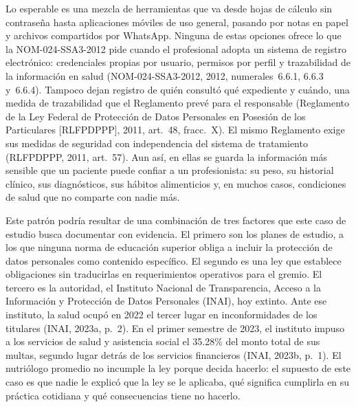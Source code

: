 \documentclass[12pt, a4paper]{article}
\begin{document}
Lo esperable es una mezcla de herramientas que va desde hojas de cálculo
sin contraseña hasta aplicaciones móviles de uso general, pasando por
notas en papel y archivos compartidos por WhatsApp. Ninguna de estas
opciones ofrece lo que la NOM-024-SSA3-2012 pide cuando el profesional
adopta un sistema de registro electrónico: credenciales propias por
usuario, permisos por perfil y trazabilidad de la información en salud
(NOM-024-SSA3-2012, 2012, numerales~6.6.1, 6.6.3 y~6.6.4). Tampoco dejan
registro de quién consultó qué expediente y cuándo, una medida de
trazabilidad que el Reglamento prevé para el responsable (Reglamento de
la Ley Federal de Protección de Datos Personales en Posesión de los
Particulares [RLFPDPPP], 2011, art.~48, fracc.~X). El mismo Reglamento
exige sus medidas de seguridad con independencia del sistema de
tratamiento (RLFPDPPP, 2011, art.~57). Aun así, en ellas se guarda la
información más sensible que un paciente puede confiar a un
profesionista: su peso, su historial clínico, sus diagnósticos, sus
hábitos alimenticios y, en muchos casos, condiciones de salud que no
comparte con nadie más.

Este patrón podría resultar de una combinación de tres factores que este
caso de estudio busca documentar con evidencia. El primero son los
planes de estudio, a los que ninguna norma de educación superior obliga
a incluir la protección de datos personales como contenido específico.
El segundo es una ley que establece obligaciones sin traducirlas en
requerimientos operativos para el gremio. El tercero es la autoridad, el
Instituto Nacional de Transparencia, Acceso a la Información y
Protección de Datos Personales (INAI), hoy extinto. Ante ese instituto,
la salud ocupó en 2022 el tercer lugar en inconformidades de los
titulares (INAI, 2023a, p.~2). En el primer semestre de 2023, el
instituto impuso a los servicios de salud y asistencia social el 35.28\%
del monto total de sus multas, segundo lugar detrás de los servicios
financieros (INAI, 2023b, p.~1). El nutriólogo promedio no incumple la
ley porque decida hacerlo: el supuesto de este caso es que nadie le
explicó que la ley se le aplicaba, qué significa cumplirla en su
práctica cotidiana y qué consecuencias tiene no hacerlo.
 
\end{document}

